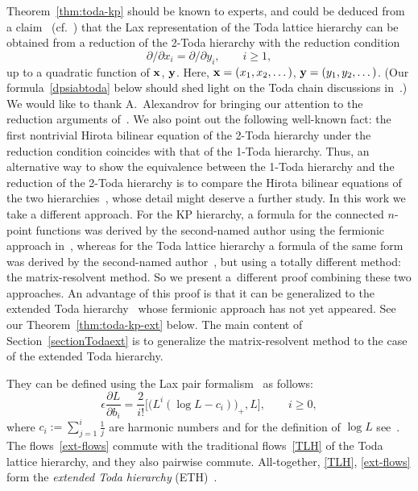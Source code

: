 \documentclass[11pt]{article}
\numberwithin{equation}{section}
\newcommand{\e}{\epsilon}
\newcommand{\p}{\partial}
\newcommand{\beq}{\begin{equation}}
\newcommand{\eeq}{\end{equation}}
\numberwithin{equation}{section}
\begin{document}
\begin{Remark}\label{remark12}
Theorem~\ref{thm:toda-kp} should be known to experts, and could be deduced
from a claim~\cite[p.~30]{UT} (cf.\ \cite{KMMM}) that the Lax representation of the
Toda lattice hierarchy can be obtained from
a reduction of the 2-Toda hierarchy with
the reduction condition
\[
\p/\p x_i = \p /\p y_i, \qquad i\ge1,
\]
up to a quadratic function
of ${\bf x}$, ${\bf y}$. Here, ${\bf x}=(x_1,x_2,\dots)$, ${\bf y}=(y_1,y_2,\dots)$.
(Our formula~\eqref{dpsiabtoda} below should shed light on the Toda chain discussions in~\cite{KMMM}.)
We would like to thank A.~Alexandrov for bringing our attention to the reduction arguments of~\cite{UT}.
We also point out the following well-known fact: the first nontrivial Hirota bilinear equation
of the 2-Toda hierarchy under the reduction condition coincides with that of the 1-Toda hierarchy. Thus, an alternative way to
show the equivalence between the 1-Toda hierarchy and the reduction of the 2-Toda hierarchy is
to compare the Hirota bilinear equations of the two hierarchies~\cite{Milanov, UT}, whose detail might deserve
a further study.
In this work we take a different approach. For the KP hierarchy,
a formula for the connected $n$-point functions was derived by the second-named author using the fermionic approach in~\cite{Zhou-Emergent},
whereas for the Toda lattice hierarchy a formula of the same form was derived by the second-named author~\cite{Y}, but using a totally different method:
the matrix-resolvent method. So we present a~different proof combining these two approaches. An advantage of this proof is that it can be generalized
to the extended Toda hierarchy~\cite{CDZ} whose fermionic approach has not yet appeared. See our Theorem~\ref{thm:toda-kp-ext} below. The main content of Section~\ref{sectionTodaext}
is to generalize the matrix-resolvent method to the case of the extended Toda hierarchy.
\end{Remark}

\setcounter{Theorem}{2}
They can be defined using the Lax pair formalism~\cite{CDZ} as follows:
\beq\label{ext-flows}
\e\frac{\p L}{\p b_i} = \frac{2}{i!}\bigl[\bigl(L^i(\log L - c_i)\bigr)_+,L\bigr], \qquad i\geq0,
\eeq
where $c_i:=\sum_{j=1}^i \frac1j$ are harmonic numbers and for the definition of $\log L$ see~\cite{CDZ, Milanov}.
The flows~\eqref{ext-flows} commute with the traditional flows~\eqref{TLH}
of the Toda lattice hierarchy, and they also pairwise commute.
All-together, \eqref{TLH}, \eqref{ext-flows} form the {\it extended Toda hierarchy} (ETH)~\cite{CDZ, Getzler, Zhang}.
\end{document}
